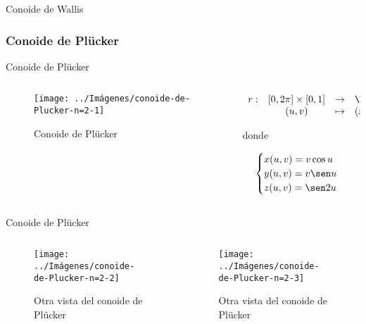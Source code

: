 \documentclass[10pt]{beamer}
\begin{document}
	\begin{frame}{Conoide de Wallis}
	\end{frame}
	
	\subsubsection{Conoide de Plücker}
	
	\begin{frame}{Conoide de Plücker}
		\begin{columns}[t] %
			\begin{column}{.50\textwidth}
				\begin{figure}
					\centering
					\texttt{[image: ../Imágenes/conoide-de-Plucker-n=2-1]}
					\caption{Conoide de Plücker}
					\label{fig:conoide-de-Plucker-1}
				\end{figure}
			\end{column}%
			\hfill%
			\begin{column}{.50\textwidth}
				$$\begin{array}{rcll}
				r : & [0, 2\pi] \times [0,1] & \to & \R^3\\
				& (u,v) & \mapsto & (x,y,z)
				\end{array}$$
				
				donde 
				
				$$ \begin{cases}
				x(u,v) = v \cos u \\
				y(u,v) = v \sen u \\
				z(u,v) = \sen 2u
				\end{cases} $$
			\end{column}%
		\end{columns}
	\end{frame}
	
	\begin{frame}{Conoide de Plücker}
		\begin{columns}[b] %
			\begin{column}{.50\textwidth}
				\begin{figure}
					\centering
					\texttt{[image: ../Imágenes/conoide-de-Plucker-n=2-2]}
					\caption{Otra vista del conoide de Plücker}
					\label{fig:conoide-de-Plücker-2}
				\end{figure}
			\end{column}%
			\hfill%
			\begin{column}{.50\textwidth}
				\begin{figure}
					\centering
					\texttt{[image: ../Imágenes/conoide-de-Plucker-n=2-3]}
					\caption{Otra vista del conoide de Plücker}
					\label{fig:conoide-de-Plucker-3}
				\end{figure}
			\end{column}%
		\end{columns}
	\end{frame}
	
\end{document}
